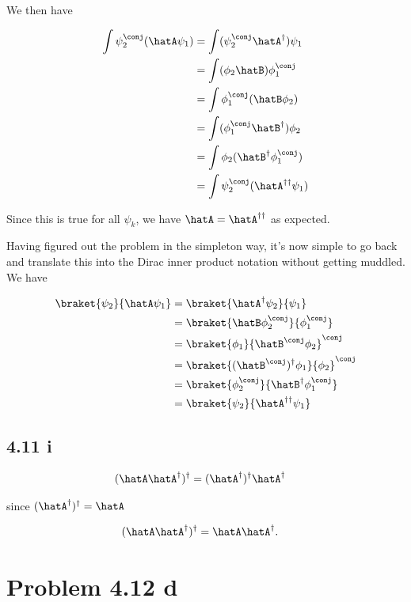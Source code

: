 We then have

\begin{align*}
\int \psi_2^\conj (\hatA \psi_1)
&=
\int (\psi_2^\conj \hatA^\dagger) \psi_1 \\
&=
\int (\phi_2 \hatB) \phi_1^\conj \\
&=
\int \phi_1^\conj (\hatB \phi_2) \\
&=
\int (\phi_1^\conj \hatB^\dagger) \phi_2 \\
&=
\int \phi_2 (\hatB^\dagger \phi_1^\conj) \\
&=
\int \psi_2^\conj (\hatA^{\dagger \dagger} \psi_1) \\
\end{align*}

Since this is true for all $\psi_k$, we have $\hatA = \hatA^{\dagger \dagger}$ as expected.

Having figured out the problem in the simpleton way, it's now simple to go back and translate this into the Dirac inner product notation without getting muddled.  We have

\begin{align*}
\braket{ \psi_2 }{ \hatA \psi_1 } 
&=
\braket{ \hatA^\dagger \psi_2 }{ \psi_1 }  \\
&=
\braket{ \hatB \phi_2^\conj }{ \phi_1^\conj }  \\
&=
{\braket{ \phi_1 } { \hatB^\conj \phi_2}}^\conj  \\
&=
{\braket{ (\hatB^\conj)^\dagger \phi_1 } { \phi_2}}^\conj  \\
&=
\braket{\phi_2^\conj } { \hatB^\dagger \phi_1^\conj } \\
&=
\braket{\psi_2 } { \hatA^{\dagger \dagger} \psi_1 } \\
\end{align*}

\subsection{ 4.11 i}

\begin{align*}
(\hatA \hatA^\dagger)^\dagger &= (\hatA^\dagger)^\dagger \hatA^\dagger 
\end{align*}

since $(\hatA^\dagger) ^\dagger = \hatA$

\begin{align*}
(\hatA \hatA^\dagger)^\dagger &= \hatA \hatA^\dagger.
\end{align*}

\section{Problem 4.12 d}

